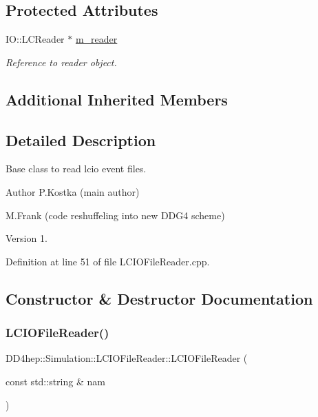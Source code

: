 \subsection*{Protected Attributes}
\begin{DoxyCompactItemize}
\item 
I\+O\+::\+L\+C\+Reader $\ast$ \hyperlink{class_d_d4hep_1_1_simulation_1_1_l_c_i_o_file_reader_a11b157abd2a7ac565d63d82158974ad7}{m\+\_\+reader}
\begin{DoxyCompactList}\small\item\em Reference to reader object. \end{DoxyCompactList}\end{DoxyCompactItemize}
\subsection*{Additional Inherited Members}


\subsection{Detailed Description}
Base class to read lcio event files. 

\begin{DoxyAuthor}{Author}
P.\+Kostka (main author) 

M.\+Frank (code reshuffeling into new D\+D\+G4 scheme) 
\end{DoxyAuthor}
\begin{DoxyVersion}{Version}
1. 
\end{DoxyVersion}


Definition at line 51 of file L\+C\+I\+O\+File\+Reader.\+cpp.



\subsection{Constructor \& Destructor Documentation}
\hypertarget{class_d_d4hep_1_1_simulation_1_1_l_c_i_o_file_reader_a98e9bb0a70768e6cd517f7f3ab552dc6}{}\label{class_d_d4hep_1_1_simulation_1_1_l_c_i_o_file_reader_a98e9bb0a70768e6cd517f7f3ab552dc6} 
\subsubsection{\texorpdfstring{L\+C\+I\+O\+File\+Reader()}{LCIOFileReader()}}
{\footnotesize\ttfamily D\+D4hep\+::\+Simulation\+::\+L\+C\+I\+O\+File\+Reader\+::\+L\+C\+I\+O\+File\+Reader (\begin{DoxyParamCaption}\item[{const std\+::string \&}]{nam }\end{DoxyParamCaption})}



